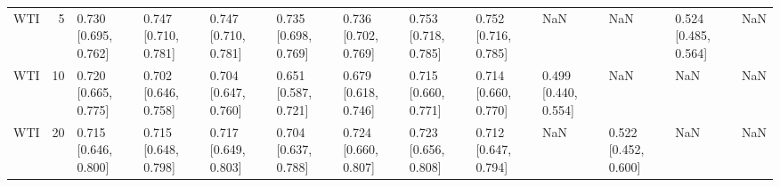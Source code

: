 \begin{tabular}{lrlllllllllll}
WTI & 5 & 0.730 [0.695, 0.762] & 0.747 [0.710, 0.781] & 0.747 [0.710, 0.781] & 0.735 [0.698, 0.769] & 0.736 [0.702, 0.769] & 0.753 [0.718, 0.785] & 0.752 [0.716, 0.785] & NaN & NaN & 0.524 [0.485, 0.564] & NaN \\
WTI & 10 & 0.720 [0.665, 0.775] & 0.702 [0.646, 0.758] & 0.704 [0.647, 0.760] & 0.651 [0.587, 0.721] & 0.679 [0.618, 0.746] & 0.715 [0.660, 0.771] & 0.714 [0.660, 0.770] & 0.499 [0.440, 0.554] & NaN & NaN & NaN \\
WTI & 20 & 0.715 [0.646, 0.800] & 0.715 [0.648, 0.798] & 0.717 [0.649, 0.803] & 0.704 [0.637, 0.788] & 0.724 [0.660, 0.807] & 0.723 [0.656, 0.808] & 0.712 [0.647, 0.794] & NaN & 0.522 [0.452, 0.600] & NaN & NaN \\
\bottomrule
\end{tabular}
